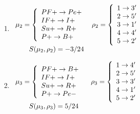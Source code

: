 \documentclass[a4paper,twoside]{article}
\begin{document}
\begin{example}[Similarity]
\begin{enumerate}
%
\item $\begin{array}{l@{\hspace{3mm}}l@{\hspace{3mm}}l}
	\mapcomp_2=\left\{
				\begin{array}{l}
					PF+ \to Pe+ \\
                    IF+ \to I+ \\
                    Su+ \to R+\\
                    P+ \to B+
				\end{array}\right.
                    &
     \maprule_2=\left\{
                \begin{array}{l}
					1 \to 3' \\
                    2 \to 5' \\
					3 \to 1' \\
                    4 \to 4' \\
					5 \to 2' \\
					\end{array}\right. 
                   \\
   \qquad  \gf(\mapcomp_2,\maprule_2)=-3/24
     \end{array}$
\item $\begin{array}{l@{\hspace{3mm}}l@{\hspace{3mm}}l}
	\mapcomp_3=\left\{
				\begin{array}{l}
					PF+ \to B+ \\
                    IF+ \to I+ \\
                    Su+ \to R+\\
                    P+ \to Pe-
				\end{array}\right.
                    &
     ~\maprule_3=\left\{
                \begin{array}{l}
					1 \to 4' \\
                    2 \to 5' \\
					3 \to 3' \\
                    4 \to 1' \\
					5 \to 2' \\
					\end{array}\right.
                    \\
     \qquad \gf(\mapcomp_3,\maprule_3)=5/24
     \end{array}$
%


\end{enumerate}
\end{example}
\end{document}
